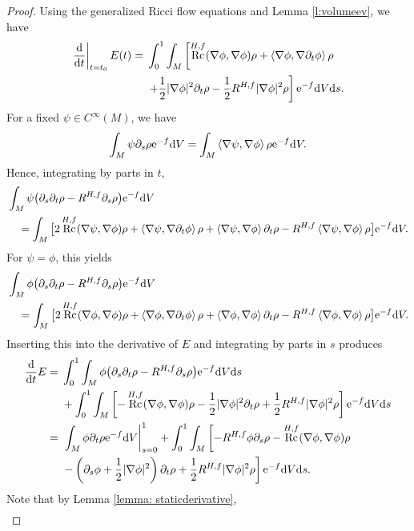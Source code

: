 \documentclass[pdftex]{sigma}
\numberwithin{equation}{section}
\newcommand{\del}{\partial}
\newcommand{\N}{\nabla}
\newcommand{\IP}[1]{\left<#1\right>}
\DeclareMathOperator{\Rc}{Rc}
\begin{document}
\begin{proof}
 Using the generalized Ricci flow equations and Lemma \ref{l:volumeev}, we have
 \begin{align*}
\left. \frac{{\rm d}}{{\rm d}t}\right|_{t=t_0} E(t) ={}&\int_0^1\int_M \left[ \Rc^{H,f}(\N\phi,\N\phi)\rho +\IP{\N\phi,\N\del_t\phi}\rho\right.\\
& \left.+\frac12|\N\phi|^2\del_t\rho-\frac12R^{H,f}|\N\phi|^2\rho \right] {\rm e}^{-f} {\rm d}V {\rm d}s.
\end{align*}
 For a fixed $\psi\in C^{\infty}(M)$, we have
 \begin{align*}
 \int_M \psi\del_s\rho {\rm e}^{-f} {\rm d}V=\int_M \IP{\N\psi,\N\phi}\rho {\rm e}^{-f} {\rm d}V.
 \end{align*}
 Hence, integrating by parts in $t$,
 \begin{align*}
 &\int_M \psi\big(\del_s\del_t\rho-R^{H,f}\del_s\rho\big){\rm e}^{-f} {\rm d}V\\
 &\quad= \int_M \big[ 2\Rc^{H,f}(\N\psi,\N\phi)\rho +\IP{\N\psi,\N\del_t\phi}\rho +\IP{\N\psi,\N\phi}\del_t\rho-R^{H,f}\IP{\N\psi,\N\phi}\rho \big] {\rm e}^{-f} {\rm d}V.
 \end{align*}
 For $\psi=\phi$, this yields
 \begin{align*}
& \int_M \phi\big(\del_s\del_t\rho-R^{H,f}\del_s\rho\big){\rm e}^{-f} {\rm d}V\\
 &\quad=
 \int_M \big[ 2\Rc^{H,f}(\N\phi,\N\phi)\rho +\IP{\N\phi,\N\del_t\phi}\rho +\IP{\N\phi,\N\phi}\del_t\rho-R^{H,f}\IP{\N\phi,\N\phi}\rho \big] {\rm e}^{-f} {\rm d}V.
 \end{align*}
 Inserting this into the derivative of $E$ and integrating by parts in $s$ produces
 \begin{align*}
 \frac{{\rm d}}{{\rm d}t} E={}&\int_0^1\int_M \phi\big(\del_s\del_t\rho-R^{H,f}\del_s\rho\big){\rm e}^{-f} {\rm d}V {\rm d}s\\
 &+\int_0^1\int_M \left[ -\Rc^{H,f}(\N\phi,\N\phi)\rho -\frac12|\N\phi|^2\del_t\rho+\frac12R^{H,f}|\N\phi|^2\rho \right] {\rm e}^{-f} {\rm d}V {\rm d}s\\
={}& \left.\int_M \phi\del_t\rho {\rm e}^{-f} {\rm d}V \right|_{s=0}^1 +\int_0^1\int_M \left[ -R^{H,f}\phi\del_s\rho-\Rc^{H,f}(\N\phi,\N\phi)\rho\right.\\
 &\left.-\left(\del_s\phi+\frac12|\N\phi|^2\right)\del_t\rho+\frac12R^{H,f}|\N\phi|^2\rho \right] {\rm e}^{-f} {\rm d}V {\rm d}s.
 \end{align*}
 Note that by Lemma \ref{lemma: staticderivative},
 \begin{align*}

\end{align*}
\end{proof}
\end{document}
